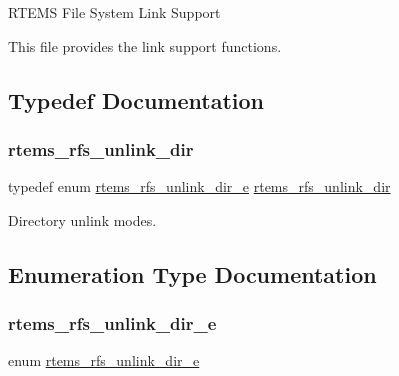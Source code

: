 R\+T\+E\+MS File System Link Support

This file provides the link support functions. 

\subsection{Typedef Documentation}
\mbox{\label{rtems-rfs-link_8h_aa5069a5066794404a5afb31ac6067cd0}} 
\subsubsection{\texorpdfstring{rtems\_rfs\_unlink\_dir}{rtems\_rfs\_unlink\_dir}}
{\footnotesize\ttfamily typedef enum \mbox{\hyperlink{rtems-rfs-link_8h_a2ba2820fed9440f306c38dbb35c14a29}{rtems\+\_\+rfs\+\_\+unlink\+\_\+dir\+\_\+e}}  \mbox{\hyperlink{rtems-rfs-link_8h_aa5069a5066794404a5afb31ac6067cd0}{rtems\+\_\+rfs\+\_\+unlink\+\_\+dir}}}

Directory unlink modes. 

\subsection{Enumeration Type Documentation}
\mbox{\label{rtems-rfs-link_8h_a2ba2820fed9440f306c38dbb35c14a29}} 
\subsubsection{\texorpdfstring{rtems\_rfs\_unlink\_dir\_e}{rtems\_rfs\_unlink\_dir\_e}}
{\footnotesize\ttfamily enum \mbox{\hyperlink{rtems-rfs-link_8h_a2ba2820fed9440f306c38dbb35c14a29}{rtems\+\_\+rfs\+\_\+unlink\+\_\+dir\+\_\+e}}}

